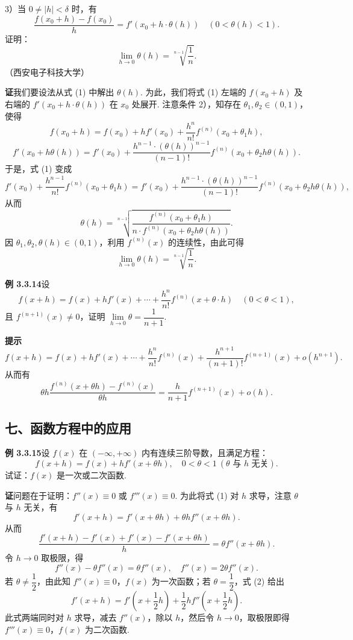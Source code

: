 \documentclass[UTF8, 12pt, fontset=fandol, oneside]{ctexart}
\begin{document}
3）当 $0\ne |h|<\delta$ 时，有
\[
  \frac{f(x_0+h)-f(x_0)}{h}=f'(x_0+h\cdot\theta(h))\quad(0<\theta(h)<1). \tag{1}
\]
证明：
\[
  \lim_{h\to0}\theta(h)=\sqrt[n-1]{\frac1n}.
\]
（西安电子科技大学）

\noindent\textbf{证}\quad 我们要设法从式 (1) 中解出 $\theta(h)$. 为此，我们将式 (1) 左端的 $f(x_0+h)$ 及右端的 $f'(x_0+h\cdot\theta(h))$ 在 $x_0$ 处展开. 注意条件 2），知存在 $\theta_1,\theta_2\in(0,1)$，使得
\[
  f(x_0+h)=f(x_0)+hf'(x_0)+\frac{h^n}{n!}f^{(n)}(x_0+\theta_1h),
\]
\[
  f'(x_0+h\theta(h))=f'(x_0)+\frac{h^{n-1}\cdot(\theta(h))^{n-1}}{(n-1)!}f^{(n)}(x_0+\theta_2h\theta(h)).
\]
于是，式 (1) 变成
\[
  f'(x_0)+\frac{h^{n-1}}{n!}f^{(n)}(x_0+\theta_1h)
  =f'(x_0)+\frac{h^{n-1}\cdot(\theta(h))^{n-1}}{(n-1)!}f^{(n)}(x_0+\theta_2h\theta(h)),
\]
从而
\[
  \theta(h)=
  \sqrt[n-1]{\frac{f^{(n)}(x_0+\theta_1h)}{n\cdot f^{(n)}(x_0+\theta_2h\theta(h))}}.
\]
因 $\theta_1,\theta_2,\theta(h)\in(0,1)$，利用 $f^{(n)}(x)$ 的连续性，由此可得
\[
  \lim_{h\to0}\theta(h)=\sqrt[n-1]{\frac1n}.
\]

\noindent\textbf{例 3.3.14}\quad 设
\[
  f(x+h)=f(x)+hf'(x)+\cdots+\frac{h^n}{n!}f^{(n)}(x+\theta\cdot h)\quad(0<\theta<1),
\]
且 $f^{(n+1)}(x)\ne0$，证明 $\lim\limits_{h\to0}\theta=\dfrac1{n+1}$.

\noindent\textbf{提示}\quad
\[
  f(x+h)=f(x)+hf'(x)+\cdots+\frac{h^n}{n!}f^{(n)}(x)
  +\frac{h^{n+1}}{(n+1)!}f^{(n+1)}(x)+o(h^{n+1}).
\]
从而有
\[
  \theta h\frac{f^{(n)}(x+\theta h)-f^{(n)}(x)}{\theta h}
  =\frac{h}{n+1}f^{(n+1)}(x)+o(h).
\]

\subsection*{七、函数方程中的应用}

\noindent\textbf{例 3.3.15}\quad 设 $f(x)$ 在 $(-\infty,+\infty)$ 内有连续三阶导数，且满足方程：
\[
  f(x+h)=f(x)+hf'(x+\theta h),\quad 0<\theta<1\ (\theta\text{ 与 }h\text{ 无关}). \tag{1}
\]
试证：$f(x)$ 是一次或二次函数.

\noindent\textbf{证}\quad 问题在于证明：$f''(x)\equiv0$ 或 $f'''(x)\equiv0$. 为此将式 (1) 对 $h$ 求导，注意 $\theta$ 与 $h$ 无关，有
\[
  f'(x+h)=f'(x+\theta h)+\theta hf''(x+\theta h). \tag{2}
\]
从而
\[
  \frac{f'(x+h)-f'(x)+f'(x)-f'(x+\theta h)}{h}
  =\theta f''(x+\theta h).
\]
令 $h\to0$ 取极限，得
\[
  f''(x)-\theta f''(x)=\theta f''(x),\quad f''(x)=2\theta f''(x).
\]
若 $\theta\ne\dfrac12$，由此知 $f''(x)\equiv0$，$f(x)$ 为一次函数；若 $\theta=\dfrac12$，式 (2) 给出
\[
  f'(x+h)=f'\left(x+\frac12h\right)+\frac12hf''\left(x+\frac12h\right).
\]
此式两端同时对 $h$ 求导，减去 $f''(x)$，除以 $h$，然后令 $h\to0$，取极限即得 $f'''(x)\equiv0$，$f(x)$ 为二次函数.
\end{document}
